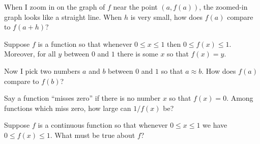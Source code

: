 \documentclass{ximera}
\newcommand{\recommendation}[1]{}
\begin{document}
\begin{shuffle}
\begin{problem}
  When I zoom in on the graph of $f$ near the
  point $(a,f(a))$, the zoomed-in graph looks like a straight line.
  When $h$ is very small, how does $f(a)$ compare to $f(a+h)$?
  \begin{multipleChoice}
  \end{multipleChoice}
\end{problem}

\begin{problem}
  Suppose $f$ is a function so that whenever $0 \leq x \leq 1$ then
  $0 \leq f(x) \leq 1$.  Moreover, for all $y$ between $0$ and $1$
  there is some $x$ so that $f(x) = y$.

  Now I pick two numbers $a$ and $b$ between $0$ and $1$ so that $a
  \approx b$.  How does $f(a)$ compare to $f(b)$?
  \begin{multipleChoice}
  \end{multipleChoice}
\end{problem}

\begin{problem}
  Say a function ``misses zero'' if there is no number $x$ so that
  $f(x) = 0$.  Among functions which miss zero, how large can $1/f(x)$
  be?
  \begin{multipleChoice}
  \end{multipleChoice}
\end{problem}

\begin{problem}
  Suppose $f$ is a continuous function so that whenever $0 \leq x \leq 1$ we have $0 \leq f(x) \leq 1$.  What must be true about $f$?
  \begin{multipleChoice}
  \end{multipleChoice}
\end{problem}


\end{shuffle}
\end{document}
